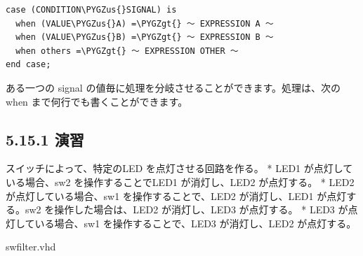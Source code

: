 \documentclass[letterpaper,10pt,dvipdfmx]{sphinxmanual}
\def\PYGZus{\char`\_}
\def\PYGZgt{\char`\>}
\begin{document}
\begin{Verbatim}[commandchars=\\\{\}]
case (CONDITION\PYGZus{}SIGNAL) is
  when (VALUE\PYGZus{}A) =\PYGZgt{} ～ EXPRESSION A ～
  when (VALUE\PYGZus{}B) =\PYGZgt{} ～ EXPRESSION B ～
  when others =\PYGZgt{} ～ EXPRESSION OTHER ～
end case;
\end{Verbatim}

ある一つの signal の値毎に処理を分岐させることができます。処理は、次の when まで何行でも書くことができます。


\subsection{5.15.1 演習}
\label{05_try:id24}
スイッチによって、特定のLED を点灯させる回路を作る。
* LED1 が点灯している場合、sw2 を操作することでLED1 が消灯し、LED2 が点灯する。
* LED2 が点灯している場合、sw1 を操作することで、LED2 が消灯し、LED1 が点灯する。sw2 を操作した場合は、LED2 が消灯し、LED3 が点灯する。
* LED3 が点灯している場合、sw1 を操作することで、LED3 が消灯し、LED2 が点灯する。

swfilter.vhd
\end{document}

